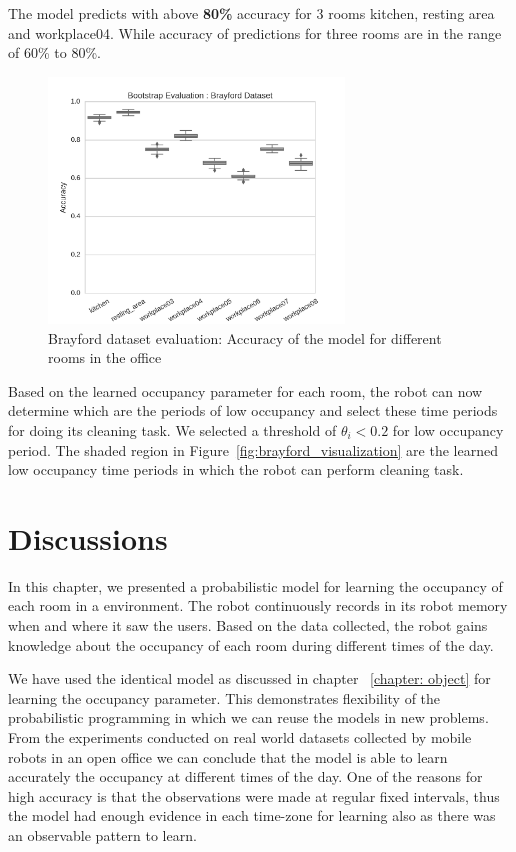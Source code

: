 The model predicts with above \textbf{80\%} accuracy for 3 rooms kitchen, resting area and workplace04. While accuracy of predictions for three rooms are in the range of 60\% to 80\%.

\begin{figure}[htp]
\centering
\includegraphics[width=0.7\textwidth]{images/Brayford_dataset_results_evaluation.png}
\caption[Brayford Dataset Evaluation]{Brayford dataset evaluation: Accuracy of the model for different rooms in the office}
\label{fig:brayford_evaluation}
\end{figure}



Based on the learned occupancy parameter for each room, the robot can now determine which are the periods of low occupancy and select these time periods for doing its cleaning task. We selected a threshold of $\theta_i < 0.2$ for low occupancy period. The shaded region in Figure~\ref{fig:brayford_visualization} are the learned low occupancy time periods in which the robot can perform cleaning task.
\FloatBarrier

\section{Discussions}

In this chapter, we presented a probabilistic model for learning the occupancy of each room in a environment. The robot continuously records in its robot memory when and where it saw the users. Based on the data collected, the robot gains knowledge about the occupancy of each room during different times of the day.

We have used the identical model as discussed in chapter ~\ref{chapter: object} for learning the occupancy parameter. This demonstrates flexibility of the probabilistic programming in which we can reuse the models in new problems.
From the experiments conducted on real world datasets collected by mobile robots in an open office we can conclude that the model is able to learn accurately the occupancy at different times of the day. One of the reasons for high accuracy is that the observations were made at regular fixed intervals, thus the model had enough evidence in each time-zone for learning also as there was an observable pattern to learn.